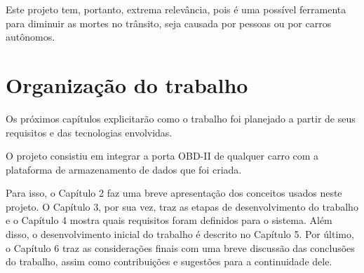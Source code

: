 Este projeto tem, portanto, extrema relevância, pois é uma possível ferramenta para diminuir as mortes no trânsito, seja causada por pessoas ou por carros autônomos.

\section{Organização do trabalho}
Os próximos capítulos explicitarão como o trabalho foi planejado a partir de seus requisitos e das tecnologias envolvidas.

O projeto consistiu em integrar a porta OBD-II de qualquer carro com a plataforma de armazenamento de dados que foi criada.

Para isso, o Capítulo 2 faz uma breve apresentação dos conceitos usados neste projeto. O Capítulo 3, por sua vez, traz as etapas de desenvolvimento do trabalho e o Capítulo 4 mostra quais requisitos foram definidos para o sistema. Além disso, o desenvolvimento inicial do trabalho é descrito no Capítulo 5. Por último, o Capítulo 6 traz as considerações finais com uma breve discussão das conclusões do trabalho, assim como contribuições e sugestões para a continuidade dele.